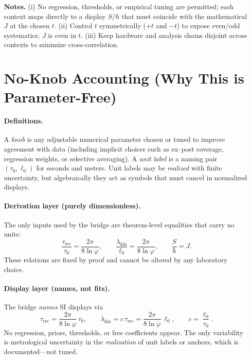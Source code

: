 \documentclass[11pt]{article}
\begin{document}
\textbf{Notes.}
(i) No regression, thresholds, or empirical tuning are permitted; each context maps directly to a display \(S/\hbar\) that must coincide with the mathematical \(J\) at the chosen \(t\).
(ii) Control \(t\) symmetrically (\(+t\) and \(-t\)) to expose even/odd systematics; \(J\) is even in \(t\).
(iii) Keep hardware and analysis chains disjoint across contexts to minimize cross-correlation.

\section{No-Knob Accounting (Why This is Parameter-Free)}

\paragraph{Definitions.}
A \emph{knob} is any adjustable numerical parameter chosen or tuned to improve agreement with data (including implicit choices such as ex–post coverage, regression weights, or selective averaging). A \emph{unit label} is a naming pair \((\tau_{0},\ell_{0})\) for seconds and meters. Unit labels may be \emph{realized} with finite uncertainty, but algebraically they act as symbols that must cancel in normalized displays.

\paragraph{Derivation layer (purely dimensionless).}
The only inputs used by the bridge are theorem-level equalities that carry no units:
\[
\frac{\tau_{\mathrm{rec}}}{\tau_{0}}=\frac{2\pi}{8\ln\varphi},\qquad
\frac{\lambda_{\mathrm{kin}}}{\ell_{0}}=\frac{2\pi}{8\ln\varphi},\qquad
\frac{S}{\hbar}=J.
\]
These relations are fixed by proof and cannot be altered by any laboratory choice.

\paragraph{Display layer (names, not fits).}
The bridge \emph{names} SI displays via
\[
\tau_{\mathrm{rec}}=\frac{2\pi}{8\ln\varphi}\,\tau_{0},\qquad
\lambda_{\mathrm{kin}}=c\,\tau_{\mathrm{rec}}=\frac{2\pi}{8\ln\varphi}\,\ell_{0},\qquad
c=\frac{\ell_{0}}{\tau_{0}}.
\]
No regression, priors, thresholds, or free coefficients appear. The only variability is metrological uncertainty in the \emph{realization} of unit labels or anchors, which is documented—not tuned.
\end{document}
